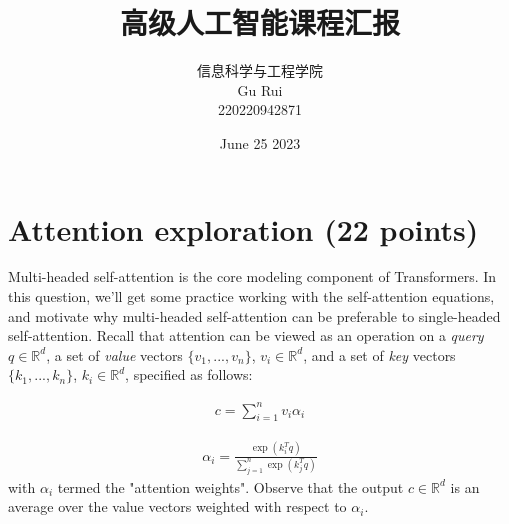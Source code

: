 \documentclass[letterpaper,12pt]{article}
\begin{document}
	
	
	\title{\songti {}高级人工智能课程汇报}
	\author{信息科学与工程学院 \\ \textrm{Gu Rui} \\ 220220942871}
	\date{\textrm{June 25  2023}}
	\maketitle
	
	\renewcommand{\figurename}{Figure} %
	\renewcommand{\contentsname}{Contents}
	\renewcommand{\tablename}{Table}
	\tableofcontents  %
	
	\section{Attention exploration (22 points)}
	
	\noindent Multi-headed self-attention is the core modeling component of Transformers. In this question, we'll get some practice working with the self-attention equations, and motivate why multi-headed self-attention can be preferable to single-headed self-attention.
	Recall that attention can be viewed as an operation on a \textit{query} $q \in \mathbb{R}^d$, a set of \textit{value} vectors $\{v_1, . . . , v_n \}$, $v_i \in \mathbb{R}^d$, and a set of \textit{key} vectors $\{k_1, . . . , k_n\}$, $k_i \in \mathbb{R}^d$, specified as follows:
	
	\begin{equation}
		\begin{aligned}
			c = \sum_{i=1}^{n} v_{i}\alpha_{i}
		\end{aligned}
		\label{eq: Attention_formula_1}
	\end{equation}
	
	\begin{equation}
		\begin{aligned}
			\alpha_{i} = \frac{\exp(k_{i}^{T}q)}{\sum_{j=1}^{n} \exp(k_{j}^{T}q)}
		\end{aligned}
		\label{eq: Attention_formula_2}
	\end{equation}
	with $\alpha_i$ termed the "attention weights". Observe that the output $c \in \mathbb{R}^d$ is an average over the value vectors weighted with respect to $\alpha_i$.
\end{document}

